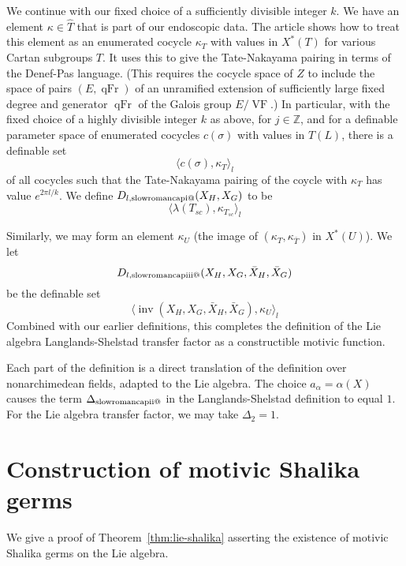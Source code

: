 \documentclass[12pt]{amsart}
\makeatletter
\newcommand*{\rom}[1]{\text{\expandafter\@slowromancap\romannumeral #1@}}
\newcommand{\op}[1]{\operatorname{#1}}
\newcommand{\ring}[1]{{\mathbb #1}}
\def\VF{{\op{VF}}}
\theoremstyle{plain}
\theoremstyle{definition}
\makeatother
\begin{document}
We continue with our fixed choice of a sufficiently divisible integer
$k$.  We have an element $\kappa\in \hat T$ that is part of our
endoscopic data.  The article \cite{CHL} shows how to treat this
element as an enumerated cocycle $\kappa_T$ with values in $X^*(T)$
for various Cartan subgroups $T$.  It uses this to give the
Tate-Nakayama pairing in terms of the Denef-Pas language.  (This
requires the cocycle space of $Z$ to include the space of pairs
$(E,\op{qFr})$ of an unramified extension of sufficiently large fixed
degree and generator $\op{qFr}$ of the Galois group $E/\VF$.)  In
particular, with the fixed choice of a highly divisible integer $k$ as
above, for $j\in \ring{Z}$, and for a definable parameter space of
enumerated cocycles $c(\sigma)$ with values in $T(L)$, there is a
definable set
\[
\langle c(\sigma),\kappa_T\rangle_l
\]
of all cocycles such that the Tate-Nakayama pairing of the coycle with
$\kappa_T$ has value $e^{2\pi l/k}$.  We define $D_{l,\rom1}(X_H,X_G)$ to
be
\[
\langle \lambda(T_{sc}),\kappa_{T_{sc}}\rangle_l
\]

Similarly, we may form an element $\kappa_U$ (the image of
$(\kappa_T,\kappa_{\bar T})$ in $X^*(U)$).  We let
\[
D_{l,\rom{3}}(X_H,X_G,\bar X_H,\bar X_G)
\]
 be the definable set
\[
\langle \op{inv}(X_H,X_G,\bar
X_H,\bar X_G),\kappa_{U}\rangle_l
\]
Combined with our earlier definitions, this completes the definition
of the Lie algebra Langlands-Shelstad transfer factor as a
constructible motivic function.


Each part of the definition is a direct translation of the definition
over nonarchimedean fields, adapted to the Lie algebra.  The choice
$a_\alpha = \alpha(X)$ causes the term $\Delta_{\rom2}$ in the
Langlands-Shelstad definition to equal $1$.  For the Lie algebra
transfer factor, we may take $\Delta_{2}=1$.

\section{Construction of motivic Shalika germs}

We give a proof of Theorem~\ref{thm:lie-shalika} asserting the
existence of motivic Shalika germs on the Lie algebra.
\end{document}
